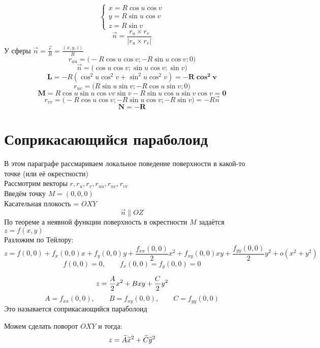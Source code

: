 \begin{eg}
	$$
	\begin{cases}
		x = R\cos u \cos v \\
		y = R\sin u \cos v \\
		z = R\sin v
	\end{cases} $$
	$$ \vec{n} = \frac{r_u \times r_v}{|r_u \times r_v|} $$
	У сферы $ \vec{n} = \frac{\vec{r}}R = \frac{(x, y, z)}R $
	$$ r_{uu} = \bigg( -R\cos u \cos v; -R \sin u\cos v; 0 \bigg) $$
	$$ \vec{n} = \bigg( \cos u \cos v; \sin u \cos v; \sin v \bigg) $$
	$$ \bm{L} = -R(\cos^2u\cos^2v + \sin^2u\cos^2v) = \bm{-R\cos^2v} $$
	$$ r_{uv} = \bigg( R\sin u\sin v; -R\cos u \sin v; 0 \bigg) $$
	$$ \bm{M} = R\cos u \sin u \cos vv \sin v - R\sin u \cos u \sin v \cos v = \bm0 $$
	$$ r_{vv} = \bigg( -R\cos u\cos v; -R\sin u\cos v; -R\sin v \bigg) = -R\vec{n} $$
	$$ \bm{N} = \bm{-R} $$
\end{eg}

\section{Соприкасающийся параболоид}

В этом параграфе рассмариваем локальное поведение поверхности в какой-то точке (или её окрестности) \\
Рассмотрим векторы $ r, r_u, r_v, r_{uu}, r_{uv}, r_{vv} $ \\
Введём точку $ M = (0, 0, 0) $ \\
Касательная плокость = $ OXY $
$$ \vec{n} \parallel OZ $$
По теореме а неявной функции поверхность в окрестности $ M $ задаётся $ z = f(x, y) $ \\
Разложим по Тейлору:
$$ z = f(0, 0) + f_x(0, 0)x + f_y(0, 0)y + \frac{f_{xx}(0, 0)}2x^2 + f_{xy}(0, 0)xy + \frac{f_{yy}(0, 0)}2y^2 + o(x^2 + y^2) $$
$$ f(0, 0) = 0, \qquad f_x(0, 0) = f_y(0, 0) = 0 $$

\begin{definition}
	$$ z = \half[A]x^2 + Bxy + \half[C]y^2 $$
	$$ A = f_{xx}(0, 0), \qquad B = f_{xy}(0, 0), \qquad C = f_{yy}(0, 0) $$
	Это называется соприкасающийся параболоид
\end{definition}

Можем сделать поворот $ OXY $ и тогда:
$$ z = \vawe{A}\vawe{x}^2 + \vawe{C}\vawe{y}^2 $$


